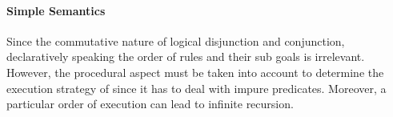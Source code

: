 \documentclass[thesis-solanki.tex]{subfiles}
\begin{document}
\begin{comment}
\subsection{Function terms}

Functions have the form \Verb!<functor>(<term>{,<term>})!
where \Verb!functor! starts with a lower-case alphabetic. 
\paragraph{Example}
\par
\begin{verbatim}
prerequisite_to(adv_ai)
grade_attained_in(prerequisite_to(adv_ai),pass)
\end{verbatim}
     
The number of arguments is the arity of the function. When referring to a functor, it is written with its arity in
the format \Verb!<functor>/<arity>!. This is also true for atoms, whose arity is 0.
Note that this is a recursive definition.
\paragraph{The view of functions as trees}
\subparagraph{Operators}
Some functors are used in infix notation, e.g., \Verb!5+4!.
Operators do not cause the associated function to be carried out.
\subparagraph{Variables}

Uppercase or `\Verb!_!' start variables.
\paragraph{Example}
\begin{verbatim}
Who
What
_special
_
\end{verbatim}
     
Variables in \progLang{Prolog} are rather different from those in most other languages. Further discussion and use is deferred until later.

\end{comment}

\paragraph{Simple Semantics}

Since the commutative nature of logical disjunction and conjunction, declaratively speaking the order of rules and their sub goals is
irrelevant. However, the procedural aspect must be taken into account to determine the execution strategy of  since it
has to deal with impure predicates. Moreover, a particular order of execution can lead to infinite recursion.
\end{document}
